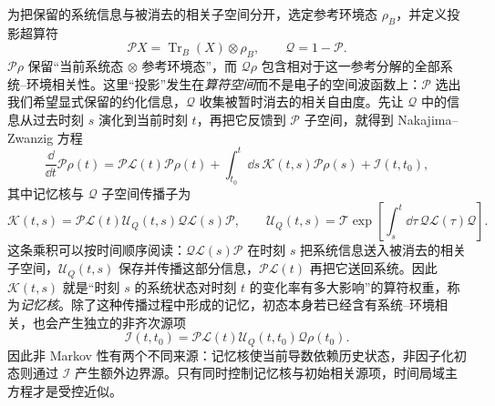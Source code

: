 为把保留的系统信息与被消去的相关子空间分开，选定参考环境态 $\rho_B$，并定义投影超算符
\[
\mathcal PX=\operatorname{Tr}_B(X)\otimes\rho_B,
\qquad
\mathcal Q=1-\mathcal P.
\]
$\mathcal P\rho$ 保留“当前系统态 $\otimes$ 参考环境态”，而 $\mathcal Q\rho$ 包含相对于这一参考分解的全部系统--环境相关性。这里“投影”发生在\emph{算符空间}而不是电子的空间波函数上：$\mathcal P$ 选出我们希望显式保留的约化信息，$\mathcal Q$ 收集被暂时消去的相关自由度。先让 $\mathcal Q$ 中的信息从过去时刻 $s$ 演化到当前时刻 $t$，再把它反馈到 $\mathcal P$ 子空间，就得到 Nakajima--Zwanzig 方程
\begin{equation}
\boxed{
\frac{\dd}{\dd t}\mathcal P\rho(t)
=\mathcal P\mathcal L(t)\mathcal P\rho(t)
+\int_{t_0}^{t}\dd s\,\mathcal K(t,s)\mathcal P\rho(s)
+\mathcal I(t,t_0),}
\label{eq:exact_nakajima_zwanzig}
\end{equation}
其中记忆核与 $\mathcal Q$ 子空间传播子为
\[
\mathcal K(t,s)
=\mathcal P\mathcal L(t)\mathcal U_Q(t,s)\mathcal Q\mathcal L(s)\mathcal P,
\qquad
\mathcal U_Q(t,s)=\mathcal T\exp\!\left[\int_s^t\dd\tau\,\mathcal Q\mathcal L(\tau)\mathcal Q\right].
\]
这条乘积可以按时间顺序阅读：$\mathcal Q\mathcal L(s)\mathcal P$ 在时刻 $s$ 把系统信息送入被消去的相关子空间，$\mathcal U_Q(t,s)$ 保存并传播这部分信息，$\mathcal P\mathcal L(t)$ 再把它送回系统。因此 $\mathcal K(t,s)$ 就是“时刻 $s$ 的系统状态对时刻 $t$ 的变化率有多大影响”的算符权重，称为\emph{记忆核}。除了这种传播过程中形成的记忆，初态本身若已经含有系统--环境相关，也会产生独立的非齐次源项
\begin{equation}
\boxed{
\mathcal I(t,t_0)
=\mathcal P\mathcal L(t)\mathcal U_Q(t,t_0)\mathcal Q\rho(t_0).}
\label{eq:exact_nz_initial_correlation}
\end{equation}
因此非 Markov 性有两个不同来源：记忆核使当前导数依赖历史状态，非因子化初态则通过 $\mathcal I$ 产生额外边界源。只有同时控制记忆核与初始相关源项，时间局域主方程才是受控近似。

